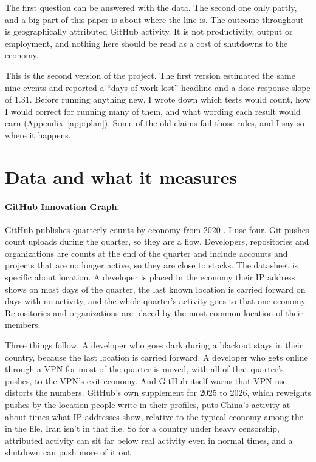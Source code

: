 \documentclass[11pt]{article}
\begin{document}
The first question can be answered with the data. The second one only partly, and a big part of this paper is about where the line is. The outcome throughout is geographically attributed GitHub activity. It is not productivity, output or employment, and nothing here should be read as a cost of shutdowns to the economy.

This is the second version of the project. The first version estimated the same nine events and reported a ``days of work lost'' headline and a dose response slope of 1.31. Before running anything new, I wrote down which tests would count, how I would correct for running many of them, and what wording each result would earn (Appendix~\ref{app:plan}). Some of the old claims fail those rules, and I say so where it happens.

\section{Data and what it measures}
\label{sec:data}

\paragraph{GitHub Innovation Graph.} GitHub publishes quarterly counts by economy from 2020 \citep{innovationgraph}. I use four. Git pushes count uploads during the quarter, so they are a flow. Developers, repositories and organizations are counts at the end of the quarter and include accounts and projects that are no longer active, so they are close to stocks. The datasheet is specific about location. A developer is placed in the economy their IP address shows on most days of the quarter, the last known location is carried forward on days with no activity, and the whole quarter's activity goes to that one economy. Repositories and organizations are placed by the most common location of their members.

Three things follow. A developer who goes dark during a blackout stays in their country, because the last location is carried forward. A developer who gets online through a VPN for most of the quarter is moved, with all of that quarter's pushes, to the VPN's exit economy. And GitHub itself warns that VPN use distorts the numbers. GitHub's own supplement for 2025 to 2026, which reweights pushes by the location people write in their profiles, puts China's activity at about \chinaratio{} times what IP addresses show, relative to the typical economy among the \supn{} in the file. Iran isn't in that file. So for a country under heavy censorship, attributed activity can sit far below real activity even in normal times, and a shutdown can push more of it out.
\end{document}
